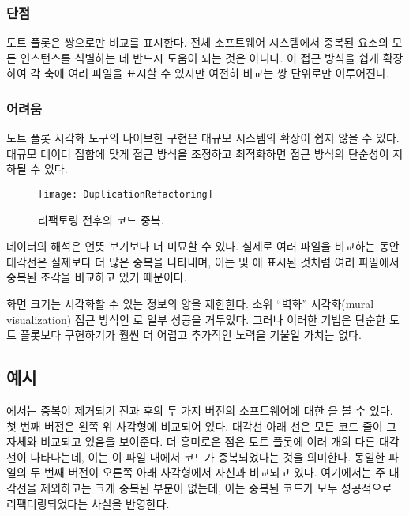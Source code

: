 \documentclass[a4paper,10pt,twoside]{book}
\begin{document}
\subsubsection*{단점}

\begin{bulletlist}
\item 도트 플롯은 쌍으로만 비교를 표시한다. 전체 소프트웨어 시스템에서 중복된 요소의 모든 인스턴스를 식별하는 데 반드시 도움이 되는 것은 아니다. 이 접근 방식을 쉽게 확장하여 각 축에 여러 파일을 표시할 수 있지만 여전히 비교는 쌍 단위로만 이루어진다.
\end{bulletlist}

\subsubsection*{어려움}

\begin{bulletlist}
\item 도트 플롯 시각화 도구의 나이브한 구현은 대규모 시스템의 확장이 쉽지 않을 수 있다. 대규모 데이터 집합에 맞게 접근 방식을 조정하고 최적화하면 접근 방식의 단순성이 저하될 수 있다.

\begin{figure}[t]
\begin{center}
\texttt{[image: DuplicationRefactoring]}
\caption{리팩토링 전후의 코드 중복.}
\end{center}
\end{figure}

\item 데이터의 해석은 언뜻 보기보다 더 미묘할 수 있다. 실제로 여러 파일을 비교하는 동안 대각선은 실제보다 더 많은 중복을 나타내며, 이는  및 에 표시된 것처럼 여러 파일에서 중복된 조각을 비교하고 있기 때문이다.

\item 화면 크기는 시각화할 수 있는 정보의 양을 제한한다. 소위 ``벽화'' 시각화(mural visualization) 접근 방식인 \cite{Jerd96b}로 일부 성공을 거두었다. 그러나 이러한 기법은 단순한 도트 플롯보다 구현하기가 훨씬 더 어렵고 추가적인 노력을 기울일 가치는 없다.
\end{bulletlist}

\subsection*{예시}

에서는 중복이 제거되기 전과 후의 두 가지 버전의 소프트웨어에 대한 을 볼 수 있다. 첫 번째 버전은 왼쪽 위 사각형에 비교되어 있다. 대각선 아래 선은 모든 코드 줄이 그 자체와 비교되고 있음을 보여준다. 더 흥미로운 점은 도트 플롯에 여러 개의 다른 대각선이 나타나는데, 이는 이 파일 내에서 코드가 중복되었다는 것을 의미한다. 동일한 파일의 두 번째 버전이 오른쪽 아래 사각형에서 자신과 비교되고 있다. 여기에서는 주 대각선을 제외하고는 크게 중복된 부분이 없는데, 이는 중복된 코드가 모두 성공적으로 리팩터링되었다는 사실을 반영한다.
\end{document}
